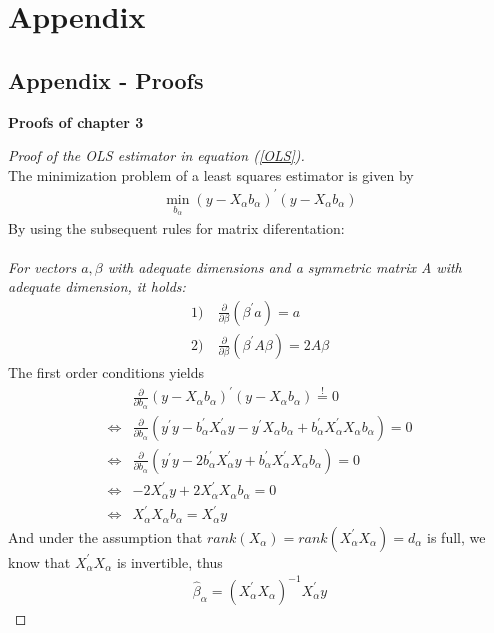 \documentclass[Research_Module_ES.tex]{subfiles}
\begin{document}
\section*{Appendix}

\subsection*{Appendix  - Proofs}

\textbf{Proofs of chapter 3}

\begin{proof}[Proof of the OLS estimator in equation (\ref{OLS})]~\\
	The minimization problem of a least squares estimator is given by
	\begin{align*}
	\min_{b_\alpha}(y-X_\alpha b_\alpha)^\prime(y-X_\alpha b_\alpha)
	\end{align*}
	By using the subsequent rules for matrix diferentation:\\\\
	\textit{For vectors $a,\beta$ with adequate dimensions and a symmetric matrix A with adequate dimension, it holds:}
	\begin{align*}
	1)&~ \frac{\partial}{\partial \beta}(\beta^\prime a)=a\\
	2)&~\frac{\partial}{\partial \beta}(\beta^\prime A\beta)=2A\beta
	\end{align*}
	The first order conditions yields
	\begin{align*}
	& \frac{\partial}{\partial b_\alpha}(y-X_\alpha b_\alpha)^\prime(y-X_\alpha b_\alpha)\stackrel{!}{=}0\\
	\Leftrightarrow & \frac{\partial}{\partial b_\alpha}(y^\prime y-b_\alpha^\prime X_\alpha^\prime y-y^\prime X_\alpha b_\alpha+b_\alpha^\prime X_\alpha^\prime X_\alpha b_\alpha)=0\\
	\Leftrightarrow & \frac{\partial}{\partial b_\alpha}(y^\prime y-2b_\alpha^\prime X_\alpha^\prime y+b_\alpha^\prime X_\alpha^\prime X_\alpha b_\alpha)=0\\
	\Leftrightarrow & -2X_\alpha^\prime y +2 X_\alpha^\prime X_\alpha b_\alpha=0\\
	\Leftrightarrow & X_\alpha^\prime X_\alpha b_\alpha=X_\alpha^\prime y
	\end{align*}
	And under the assumption that $rank(X_\alpha)=rank(X_\alpha^\prime X_\alpha)=d_\alpha$ is full, we know that $X_\alpha^\prime X_\alpha$ is invertible, thus 
	\begin{align*}
	\hat{\beta}_\alpha=(X_\alpha^\prime X_\alpha)^{-1}X_\alpha^\prime y
	\end{align*}
\end{proof}
\end{document}
